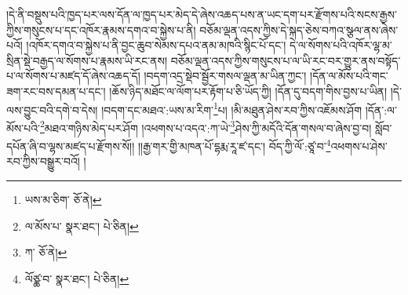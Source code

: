 །དེ་ནི་བསྡུས་པའི་ཁྱད་པར་ལས་དོན་ལ་ཁྱད་པར་མེད་དེ་ཞེས་འཆད་པས་ན་ཡང་དག་པར་རྫོགས་པའི་སངས་རྒྱས་ཀྱིས་གསུངས་པ་དང་འཁོར་རྣམས་དགའ་བ་སྐྱེས་པ་ནི། བཅོམ་ལྡན་འདས་ཀྱིས་དེ་སྐད་ཅེས་བཀའ་སྩལ་ནས་ཞེས་པའོ། །འཁོར་དགའ་བ་སྐྱེས་པ་ནི་བྱང་ཆུབ་སེམས་དཔའ་ནམ་མཁའི་སྙིང་པོ་དང་། དེ་ལ་སོགས་པའི་འཁོར་ལྷ་མ་སྲིན་སྡེ་བརྒྱད་ལ་སོགས་པ་རྣམས་ཡི་རང་ནས། བཅོམ་ལྡན་འདས་ཀྱིས་གསུངས་པ་ལ་ཡི་རང་བར་གྱུར་ནས་བསྟོད་པ་ལ་སོགས་པ་མཛད་དོ་ཞེས་འཆད་དོ། །བདག་འདྲ་སྡེབ་སྦྱོར་གསལ་ལྡན་མ་ཡིན་ཀྱང་། །དོན་ལ་མོས་པའི་གང་ཟག་རང་བས་དམན་པ་དང་། །ཆོས་ཉིད་མཐོང་ལ་ལོག་པར་རྟོག་པ་ཅི་ཡོད་ཀྱི། །དོན་དུ་བདག་གིས་བྱས་པ་ཡིན། །དེ་ལས་བྱུང་བའི་དགེ་བ་དེས། །བདག་དང་མཐའ་:ཡས་མ་རིག་\footnote{ཡས་མ་ཅིག་  ཅོ་ནེ། }པ། །མི་མཐུན་ཤེས་རབ་ཀྱིས་འཇོམས་ཤོག །དོན་:ལ་མོས་པའི་\footnote{ལ་མོས་པ་  སྣར་ཐང་།  པེ་ཅིན། }མཐའ་གཉིས་མེད་པར་ཤོག །འཕགས་པ་འདའ་:ཀ་ཡེ་\footnote{ཀ་  ཅོ་ནེ། }ཤེས་ཀྱི་མདོའི་དོན་གསལ་བ་ཞེས་བྱ་བ། སློབ་དཔོན་ཞི་བ་ལྷས་མཛད་པ་རྫོགས་སོ།། །།རྒྱ་གར་གྱི་མཁན་པོ་དྷརྨ་རཱ་ཛ་དང་། བོད་ཀྱི་ལོ་:ཙཱ་བ་\footnote{ལོཙྪ་བ་  སྣར་ཐང་།  པེ་ཅིན། }འཕགས་པ་ཤེས་རབ་ཀྱིས་བསྒྱུར་བའོ། ། 